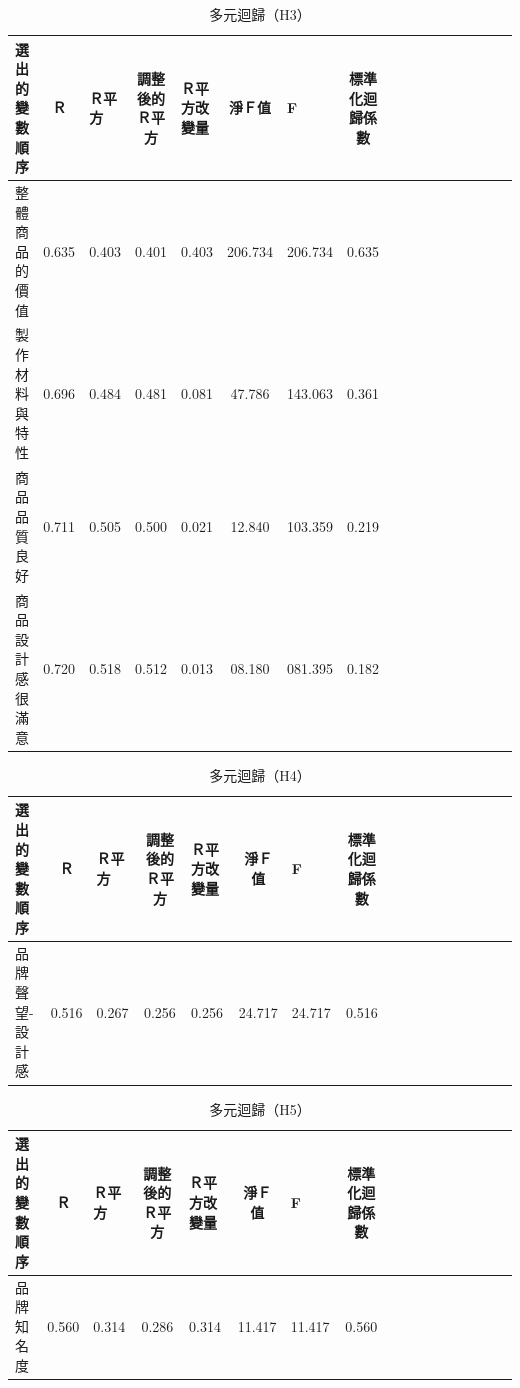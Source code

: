 \begin{table}[H]
\caption{多元迴歸（H3）}
\label{tab:QH3}
\centering
\renewcommand{\arraystretch}{1} %
\arrayrulewidth=1pt               %
\tabcolsep=4pt                   %
\begin{tabular}[t]{lclclclclclclclcl}  %
\hline
選出的變數順序&Ｒ&Ｒ平方&調整後的Ｒ平方&Ｒ平方改變量&淨Ｆ值&F&標準化迴歸係數\\
\hline
整體商品的價值& 0.635	&0.403	&0.401	&0.403	&206.734	& 206.734 & 0.635 \\

製作材料與特性& 0.696	&0.484	&0.481	&0.081	&47.786	&143.063	&0.361 \\

商品品質良好& 0.711	&0.505	&0.500	&0.021	&12.840	&103.359	&0.219 \\

商品設計感很滿意& 0.720	&0.518	&0.512	&0.013	&08.180	&081.395 &0.182 \\
\hline
\end{tabular}
\end{table}

\begin{table}[H]
\caption{多元迴歸（H4）}
\label{tab:QH4}
\centering
\renewcommand{\arraystretch}{1} %
\arrayrulewidth=1pt               %
\tabcolsep=4pt                   %
\begin{tabular}[t]{lclclclclclclclcl}  %
\hline
選出的變數順序&Ｒ&Ｒ平方&調整後的Ｒ平方&Ｒ平方改變量&淨Ｆ值&F&標準化迴歸係數\\
\hline
品牌聲望-設計感 &0.516 &0.267 & 0.256 & 0.256 & 24.717	& 24.717	& 0.516\\
\hline
\end{tabular}
\end{table}

\begin{table}[H]
\caption{多元迴歸（H5）}
\label{tab:QH5}
\centering
\renewcommand{\arraystretch}{1} %
\arrayrulewidth=1pt               %
\tabcolsep=4pt                   %
\begin{tabular}[t]{lclclclclclclclcl}  %
\hline
選出的變數順序&Ｒ&Ｒ平方&調整後的Ｒ平方&Ｒ平方改變量&淨Ｆ值&F&標準化迴歸係數\\
\hline
品牌知名度 &0.560 & 0.314 & 0.286 &0.314	&11.417	&11.417	&0.560\\
\hline
\end{tabular}
\end{table}

